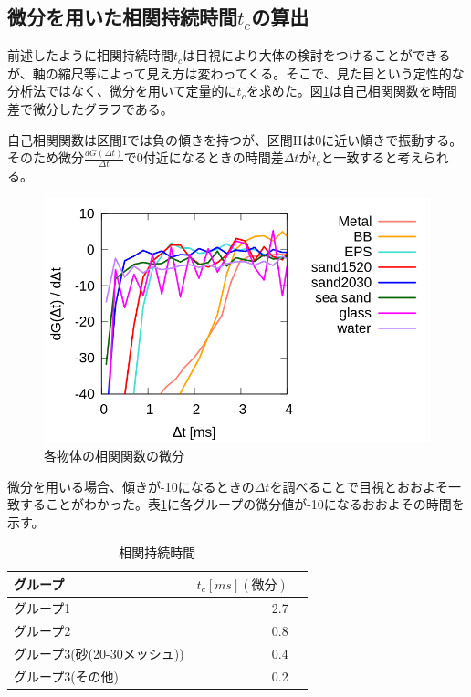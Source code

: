 \documentclass[a4paper,10pt,twocolumn,dvipdfmx]{jsarticle}
\newcommand{\Dt}{\Delta t}
\newcommand{\II}{I\hspace{-.1em}I}
\begin{document}
\subsection{微分を用いた相関持続時間$t_c$の算出}
前述したように相関持続時間$t_c$は目視により大体の検討をつけることができるが、軸の縮尺等によって見え方は変わってくる。そこで、見た目という定性的な分析法ではなく、微分を用いて定量的に$t_c$を求めた。図\ref{fig:diff}は自己相関関数を時間差で微分したグラフである。 \par
自己相関関数は区間Iでは負の傾きを持つが、区間\II は0に近い傾きで振動する。そのため微分$\frac{dG(\Dt)}{\Dt}$で0付近になるときの時間差$\Dt がt_c$と一致すると考えられる。
\begin{figure}[H]
	\includegraphics[scale=0.4]{diff.png}
	\caption{各物体の相関関数の微分}
	\label{fig:diff}
\end{figure}
微分を用いる場合、傾きが-10になるときの$\Dt$を調べることで目視とおおよそ一致することがわかった。表\ref{tb:tc_diff}に各グループの微分値が-10になるおおよその時間を示す。
\begin{table}[H]
	\caption{相関持続時間 \label{tb:tc_diff}}
	\begin{tabular}{lrr}
		\toprule
		グループ & $t_c [ms](微分)$  \\
		\midrule
		グループ1 & 2.7  \\
		グループ2 & 0.8  \\
		グループ3(砂(20-30メッシュ)) & 0.4  \\
		グループ3(その他) & 0.2 \\
		\bottomrule
	\end{tabular}
\end{table}
\end{document}
